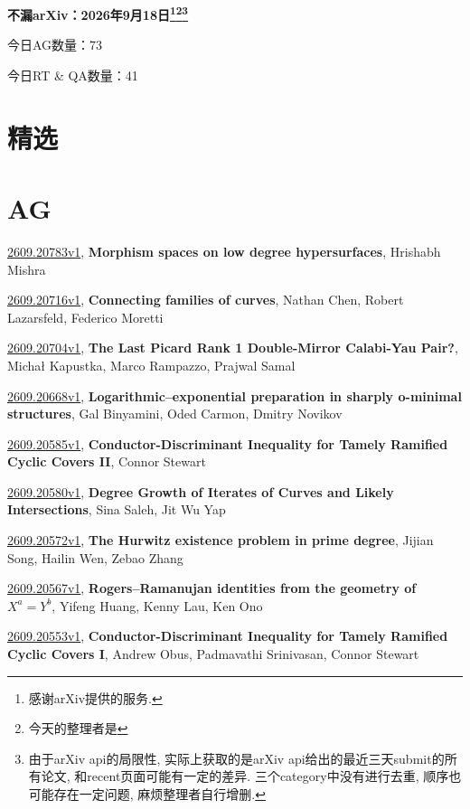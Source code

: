 \documentclass[9pt, a4paper]{article}
\theoremstyle{plain}
\theoremstyle{definition}
\theoremstyle{remark}
\newcommand{\arxiv}[3]{\href{https://arxiv.org/abs/#1}{#1}, \textbf{\textcolor{arxivblue}{#2}}, #3}
\newcommand{\AGnumber}{73}
\newcommand{\RTQAnumber}{41}
\newcommand{\NewestDate}{2026年9月18日}
\newcommand{\todayarXiver}{} %
\begin{document}
\begin{center}
    \Huge\textbf{不漏arXiv：\NewestDate\footnote{感谢arXiv提供的服务.}\footnote{今天的整理者是\todayarXiver}\footnote{由于arXiv api的局限性, 实际上获取的是arXiv api给出的最近三天submit的所有论文, 和recent页面可能有一定的差异. 三个category中没有进行去重, 顺序也可能存在一定问题, 麻烦整理者自行增删.}} \\
\end{center}

\setcounter{section}{-1}

\begin{center}
    今日AG数量：\AGnumber
    
    今日RT \& QA数量：\RTQAnumber
    
\end{center}


\section{精选}


\section{AG}
\arxiv{2609.20783v1}{Morphism spaces on low degree hypersurfaces}{Hrishabh Mishra}

\arxiv{2609.20716v1}{Connecting families of curves}{Nathan Chen, Robert Lazarsfeld, Federico Moretti}

\arxiv{2609.20704v1}{The Last Picard Rank 1 Double-Mirror Calabi-Yau Pair?}{Michał Kapustka, Marco Rampazzo, Prajwal Samal}

\arxiv{2609.20668v1}{Logarithmic--exponential preparation in sharply o-minimal structures}{Gal Binyamini, Oded Carmon, Dmitry Novikov}

\arxiv{2609.20585v1}{Conductor-Discriminant Inequality for Tamely Ramified Cyclic Covers II}{Connor Stewart}

\arxiv{2609.20580v1}{Degree Growth of Iterates of Curves and Likely Intersections}{Sina Saleh, Jit Wu Yap}

\arxiv{2609.20572v1}{The Hurwitz existence problem in prime degree}{Jijian Song, Hailin Wen, Zebao Zhang}

\arxiv{2609.20567v1}{Rogers--Ramanujan identities from the geometry of $X^a=Y^b$}{Yifeng Huang, Kenny Lau, Ken Ono}

\arxiv{2609.20553v1}{Conductor-Discriminant Inequality for Tamely Ramified Cyclic Covers I}{Andrew Obus, Padmavathi Srinivasan, Connor Stewart}
\end{document}
